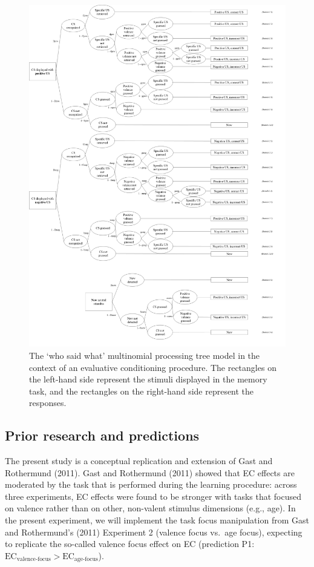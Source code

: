 \documentclass[
  doc,floatsintext]{apa6}
\begin{document}
\begin{figure}
\includegraphics[width=7.56in]{mpt_wsw_model_exp3_KB2} \caption{The `who said what' multinomial processing tree model in the context of an evaluative conditioning procedure. The rectangles on the left-hand side represent the stimuli displayed in the memory task, and the rectangles on the right-hand side represent the responses.}\label{fig:cspos-tree}
\end{figure}

\subsection{Prior research and predictions}\label{prior-research-and-predictions}

The present study is a conceptual replication and extension of Gast and Rothermund (2011).
Gast and Rothermund (2011) showed that EC effects are moderated by the task that is performed during the learning procedure: across three experiments, EC effects were found to be stronger with tasks that focused on valence rather than on other, non-valent stimulus dimensions (e.g., age).
In the present experiment, we will implement the task focus manipulation from Gast and Rothermund's (2011) Experiment 2 (valence focus vs.~age focus), expecting to replicate the so-called valence focus effect on EC (prediction P1: \(\textrm{EC}_\textrm{valence-focus}>\textrm{EC}_\textrm{age-focus}\)).
\end{document}
